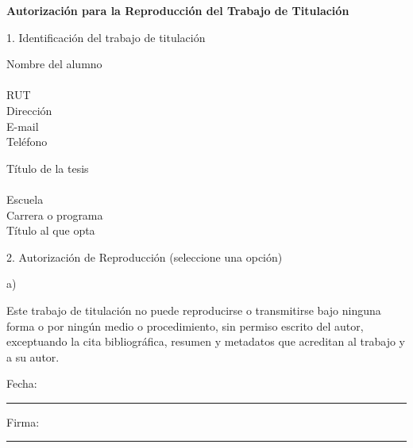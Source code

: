\begingroup
{}

\small
\setlength{\parindent}{0pt}
\setlength{\parskip}{0pt}
\setlength{\tabcolsep}{5pt}
\renewcommand{\arraystretch}{1.12}

\begin{center}
\textbf{Autorización para la Reproducción del Trabajo de Titulación}
\end{center}

\vspace{0.8cm}

1. Identificación del trabajo de titulación

\vspace{0.35cm}

Nombre del alumno\\[-0.05cm]
\dotfill\\[-0.05cm]
RUT \dotfill\\[-0.05cm]
Dirección \dotfill\\[-0.05cm]
E-mail \dotfill\\[-0.05cm]
Teléfono \dotfill

\vspace{0.45cm}

Título de la tesis\\[-0.05cm]
\dotfill\\[-0.05cm]
Escuela \dotfill\\[-0.05cm]
Carrera o programa \dotfill\\[-0.05cm]
Título al que opta \dotfill

\vspace{0.45cm}

2. Autorización de Reproducción (seleccione una opción)

\vspace{0.25cm}

\noindent a)
\hspace{1.0cm}
\begin{minipage}[t]{0.84\textwidth}
Este trabajo de titulación no puede reproducirse o transmitirse bajo ninguna forma o por ningún medio o procedimiento, sin permiso escrito del autor, exceptuando la cita bibliográfica, resumen y metadatos que acreditan al trabajo y a su autor.

\vspace{0.75cm}

Fecha: \rule{36mm}{0.1mm}
\hspace{2.2cm}
Firma: \rule{55mm}{0.1mm}
\end{minipage}

